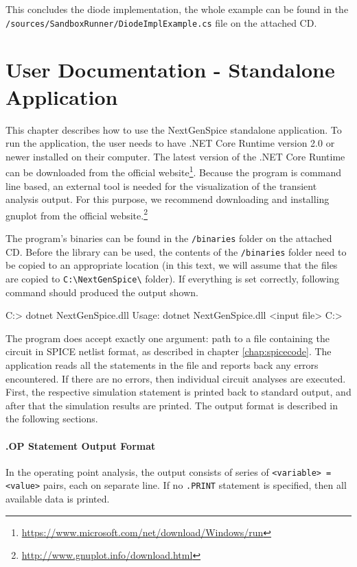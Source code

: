 This concludes the diode implementation, the whole example can be found in the  \texttt{/sources/SandboxRunner/DiodeImplExample.cs} file on the attached CD.

\chapter{User Documentation - Standalone Application}
This chapter describes how to use the NextGenSpice standalone application. To run the application, the user needs to have .NET Core Runtime version 2.0 or newer installed on their computer. The latest version of the .NET Core Runtime can be downloaded from the official website\footnote{\url{https://www.microsoft.com/net/download/Windows/run}}. Because the program is command line based, an external tool is needed for the visualization of the transient analysis output. For this purpose, we recommend downloading and installing gnuplot from the official website.\footnote{\url{http://www.gnuplot.info/download.html}}

The program's binaries can be found in the \texttt{/binaries} folder on the attached CD. Before the library can be used, the contents of the \texttt{/binaries} folder need to be copied to an appropriate location (in this text, we will assume that the files are copied to \texttt{C:\textbackslash{}NextGenSpice\textbackslash} folder). If everything is set correctly, following command should produced the output shown.

\begin{code}
C:\NextGenSpice> dotnet NextGenSpice.dll
Usage: dotnet NextGenSpice.dll <input file>
C:\NextGenSpice>
\end{code}

The program does accept exactly one argument: path to a file containing the circuit in SPICE netlist format, as described in chapter \ref{chap:spicecode}. The application reads all the statements in the file and reports back any errors encountered. If there are no errors, then individual circuit analyses are executed. First, the respective simulation statement is printed back to standard output, and after that the simulation results are printed. The output format is described in the following sections.

\subsubsection{.OP Statement Output Format}
In the operating point analysis, the output consists of series of \texttt{<variable> = <value>} pairs, each on separate line. If no \texttt{.PRINT} statement is specified, then all available data is printed.

